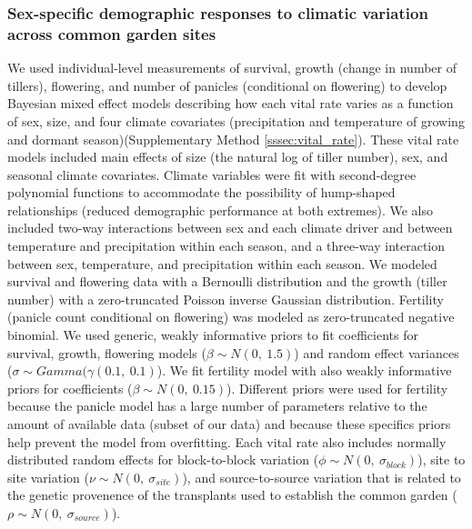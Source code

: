 \documentclass[12pt]{article}\usepackage[]{graphicx}\usepackage[dvipsnames]{xcolor}
\newcommand{\tom}[2]{{\color{red}{#1}}\footnote{\textit{\color{red}{#2}}}}
\begin{document}
\subsubsection*{Sex-specific demographic responses to climatic variation across common garden sites}
We used individual-level measurements of survival, growth (change in number of tillers), flowering, and number of panicles (conditional on flowering) to develop Bayesian mixed effect models describing how each vital rate varies as a function of sex, size, and four climate covariates (precipitation and temperature of growing and dormant season)(Supplementary Method \ref{sssec:vital_rate}). 
These vital rate models included main effects of size (the natural log of tiller number), sex, and seasonal climate covariates. 
Climate variables were fit with second-degree polynomial functions to accommodate the possibility of hump-shaped relationships (reduced demographic performance at both extremes).
We also included two-way interactions between sex and each climate driver and between temperature and precipitation within each season, and a three-way interaction between sex, temperature, and precipitation within each season. 
We modeled survival and flowering data with a Bernoulli distribution and the growth (tiller number) with a zero-truncated Poisson inverse Gaussian distribution. 
Fertility (panicle count conditional on flowering) was modeled as zero-truncated negative binomial. 
We used generic, weakly informative priors to fit coefficients for survival, growth, flowering models ($\beta \sim N(0,\ 1.5)$) and random effect variances ($\sigma \sim Gamma(\gamma (0.1,\ 0.1)$).
We fit fertility model with  also weakly informative priors for coefficients ($\beta \sim N(0,\ 0.15)$).
Different priors  were used for fertility because the panicle model has a large number of parameters relative to the amount of available data (subset of our data) and because these specifics priors help  prevent the model from overfitting. 
Each vital rate also includes normally distributed random effects for block-to-block variation ($\phi \sim N(0,\ \sigma_{block})$), site to site variation ($\nu \sim N(0,\ \sigma_{site})$), and source-to-source variation that is related to the genetic provenence of the transplants used to establish the common garden ($\rho \sim N(0,\ \sigma_{source})$).
\end{document}
